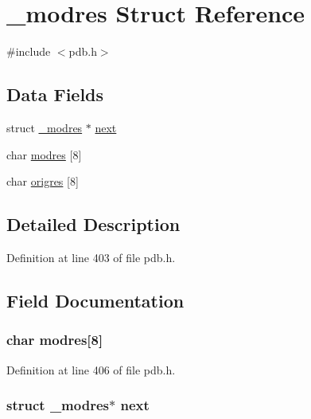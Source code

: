 \hypertarget{struct__modres}{\section{\-\_\-modres Struct Reference}
\label{struct__modres}
}


{\ttfamily \#include $<$pdb.\-h$>$}

\subsection*{Data Fields}
\begin{DoxyCompactItemize}
\item 
struct \hyperlink{struct__modres}{\-\_\-modres} $\ast$ \hyperlink{struct__modres_abf4097346f40fde96d89a9ef252d9fa2}{next}
\item 
char \hyperlink{struct__modres_a7850eae2a5158e21faf9dfa0562d30d7}{modres} \mbox{[}8\mbox{]}
\item 
char \hyperlink{struct__modres_af3d559120b450f45a3ee29281dbf70b8}{origres} \mbox{[}8\mbox{]}
\end{DoxyCompactItemize}


\subsection{Detailed Description}


Definition at line 403 of file pdb.\-h.



\subsection{Field Documentation}
\hypertarget{struct__modres_a7850eae2a5158e21faf9dfa0562d30d7}{
\subsubsection[{modres}]{\setlength{\rightskip}{0pt plus 5cm}char modres\mbox{[}8\mbox{]}}}\label{struct__modres_a7850eae2a5158e21faf9dfa0562d30d7}


Definition at line 406 of file pdb.\-h.

\hypertarget{struct__modres_abf4097346f40fde96d89a9ef252d9fa2}{
\subsubsection[{next}]{\setlength{\rightskip}{0pt plus 5cm}struct {\bf \-\_\-modres}$\ast$ next}}\label{struct__modres_abf4097346f40fde96d89a9ef252d9fa2}


